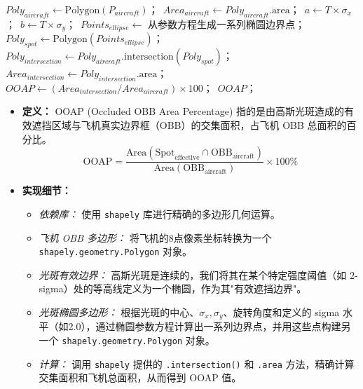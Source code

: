 \documentclass[12pt, a4paper]{report}
\begin{document}
\begin{algorithm}[htbp]
\caption{OOAP（遮挡 OBB 面积百分比）计算}
\label{alg:ooap}

$Poly_{aircraft} \leftarrow \text{Polygon}(P_{aircraft})$；\
$Area_{aircraft} \leftarrow Poly_{aircraft}.\text{area}$；\
$a \leftarrow T \times \sigma_x$；\
$b \leftarrow T \times \sigma_y$；\
$Points_{ellipse} \leftarrow$ 从参数方程生成一系列椭圆边界点；\
$Poly_{spot} \leftarrow \text{Polygon}(Points_{ellipse})$；\
$Poly_{intersection} \leftarrow Poly_{aircraft}.\text{intersection}(Poly_{spot})$；\
$Area_{intersection} \leftarrow Poly_{intersection}.\text{area}$；\
$OOAP \leftarrow (Area_{intersection} / Area_{aircraft}) \times 100$；\
\Return $OOAP$；
\end{algorithm}

\begin{itemize}
    \item \textbf{定义：} OOAP (Occluded OBB Area Percentage) 指的是由高斯光斑造成的有效遮挡区域与飞机真实边界框（OBB）的交集面积，占飞机 OBB 总面积的百分比。
    \begin{equation}
        \text{OOAP} = \frac{\text{Area}(\text{Spot}_{\text{effective}} \cap \text{OBB}_{\text{aircraft}})}{\text{Area}(\text{OBB}_{\text{aircraft}})} \times 100\%
    \end{equation}
    \item \textbf{实现细节：}
    \begin{itemize}
        \item \textit{依赖库：} 使用 \texttt{shapely} 库进行精确的多边形几何运算。
        \item \textit{飞机 OBB 多边形：} 将飞机的8点像素坐标转换为一个 \texttt{shapely.geometry.Polygon} 对象。
        \item \textit{光斑有效边界：} 高斯光斑是连续的，我们将其在某个特定强度阈值（如 2-sigma）处的等高线定义为一个椭圆，作为其"有效遮挡边界"。
        \item \textit{光斑椭圆多边形：} 根据光斑的中心、$\sigma_x, \sigma_y$、旋转角度和定义的 sigma 水平（如2.0），通过椭圆参数方程计算出一系列边界点，并用这些点构建另一个 \texttt{shapely.geometry.Polygon} 对象。
        \item \textit{计算：} 调用 \texttt{shapely} 提供的 \texttt{.intersection()} 和 \texttt{.area} 方法，精确计算交集面积和飞机总面积，从而得到 OOAP 值。
    \end{itemize}
\end{itemize}
\end{document}
